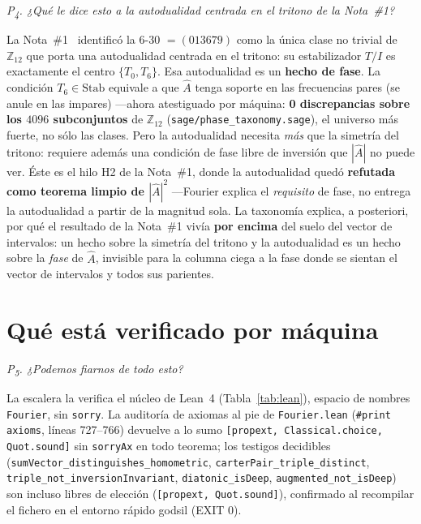 \documentclass[11pt]{article}
\newcommand{\lean}[1]{\texttt{#1}}
\newcommand{\Ztwelve}{\mathbb{Z}_{12}}
\newcommand{\Ahat}{\hat{A}}
\newcommand{\Stab}{\mathrm{Stab}}
\newcommand{\question}[1]{\smallskip\noindent\textit{#1}\smallskip}
\begin{document}
\question{P\textsubscript{4}. ¿Qué le dice esto a la autodualidad centrada en el tritono de la Nota~\#1?}

La Nota~\#1~\cite{Note1} identificó la 6-30 $=(013679)$ como la única clase no trivial de $\Ztwelve$ que
porta una autodualidad centrada en el tritono: su estabilizador $T/I$ es exactamente el centro
$\{T_0,T_6\}$. Esa autodualidad es un \textbf{hecho de fase}. La condición $T_6\in\Stab$ equivale a que
$\Ahat$ tenga soporte en las frecuencias pares (se anule en las impares) ---ahora atestiguado por máquina:
\textbf{0 discrepancias sobre los $4096$ subconjuntos} de $\Ztwelve$ (\lean{sage/phase\_taxonomy.sage}), el
universo más fuerte, no sólo las clases. Pero la autodualidad necesita \emph{más} que la simetría del
tritono: requiere además una condición de fase libre de inversión que $|\Ahat|$ no puede ver. Éste es el
hilo H2 de la Nota~\#1, donde la autodualidad quedó \textbf{refutada como teorema limpio de
$|\Ahat|^2$} ---Fourier explica el \emph{requisito} de fase, no entrega la autodualidad a partir de la
magnitud sola. La taxonomía explica, a posteriori, por qué el resultado de la Nota~\#1 vivía \textbf{por
encima} del suelo del vector de intervalos: un hecho sobre la simetría del tritono y la autodualidad es un
hecho sobre la \emph{fase} de $\Ahat$, invisible para la columna ciega a la fase donde se sientan el vector
de intervalos y todos sus parientes.

\section{Qué está verificado por máquina}\label{sec:checked}

\question{P\textsubscript{5}. ¿Podemos fiarnos de todo esto?}

La escalera la verifica el núcleo de Lean~4 (Tabla~\ref{tab:lean}), espacio de nombres \lean{Fourier}, sin
\lean{sorry}. La auditoría de axiomas al pie de \lean{Fourier.lean} (\lean{\#print axioms}, líneas
727--766) devuelve a lo sumo \lean{[propext, Classical.choice, Quot.sound]} sin \lean{sorryAx} en todo
teorema; los testigos decidibles (\lean{sumVector\_distinguishes\_homometric},
\lean{carterPair\_triple\_distinct}, \lean{triple\_not\_inversionInvariant}, \lean{diatonic\_isDeep},
\lean{augmented\_not\_isDeep}) son incluso libres de elección (\lean{[propext, Quot.sound]}), confirmado al
recompilar el fichero en el entorno rápido godsil (EXIT 0).
\end{document}
